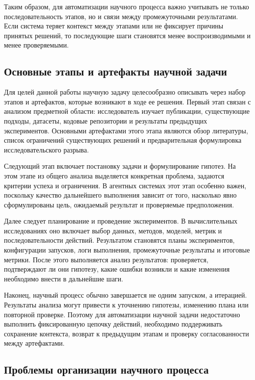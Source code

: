 Таким образом, для автоматизации научного процесса важно учитывать не только последовательность этапов, но и связи между промежуточными результатами. Если система теряет контекст между этапами или не фиксирует причины принятых решений, то последующие шаги становятся менее воспроизводимыми и менее проверяемыми.

\subsection{Основные этапы и артефакты научной задачи}

Для целей данной работы научную задачу целесообразно описывать через набор этапов и артефактов, которые возникают в ходе ее решения. Первый этап связан с анализом предметной области: исследователь изучает публикации, существующие подходы, датасеты, кодовые репозитории и результаты предыдущих экспериментов. Основными артефактами этого этапа являются обзор литературы, список ограничений существующих решений и предварительная формулировка исследовательского разрыва.

Следующий этап включает постановку задачи и формулирование гипотез. На этом этапе из общего анализа выделяется конкретная проблема, задаются критерии успеха и ограничения. В агентных системах этот этап особенно важен, поскольку качество дальнейшего выполнения зависит от того, насколько явно сформулированы цель, ожидаемый результат и проверяемые предположения.

Далее следует планирование и проведение экспериментов. В вычислительных исследованиях оно включает выбор данных, методов, моделей, метрик и последовательности действий. Результатом становятся планы экспериментов, конфигурации запусков, логи выполнения, промежуточные результаты и итоговые метрики. После этого выполняется анализ результатов: проверяется, подтверждают ли они гипотезу, какие ошибки возникли и какие изменения необходимо внести в дальнейшие шаги.

Наконец, научный процесс обычно завершается не одним запуском, а итерацией. Результаты анализа могут привести к уточнению гипотезы, изменению плана или повторной проверке. Поэтому для автоматизации научной задачи недостаточно выполнить фиксированную цепочку действий, необходимо поддерживать сохранение контекста, возврат к предыдущим этапам и проверку согласованности между артефактами.

\subsection{Проблемы организации научного процесса}

